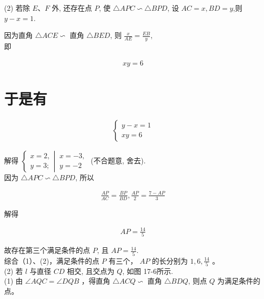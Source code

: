 \documentclass[10pt]{article}
\begin{document}
(2) 若除 $E 、 F$ 外, 还存在点 $P$, 使 $\triangle A P C \backsim \triangle B P D$, 设 $A C=x, B D=y$,则 $y-x=1$.

因为直角 $\triangle A C E \backsim$ 直角 $\triangle B E D$, 则 $\frac{x}{A E}=\frac{E B}{y}$,\\
即

\begin{align*}
x y=6
\end{align*}

\section*{于是有}
\begin{align*}
\left\{\begin{array}{l}
y-x=1 \\
x y=6
\end{array}\right.
\end{align*}

解得 $\left\{\begin{array}{l}x=2, \\ y=3 ;\end{array} \left\lvert\, \begin{array}{l}x=-3, \\ y=-2\end{array}\right.\right.$ (不合题意, 舍去).\\
因为 $\triangle A P C \backsim \triangle B P D$, 所以

\begin{align*}
\frac{A P}{A C}=\frac{B P}{B D}, \frac{A P}{2}=\frac{7-A P}{3}
\end{align*}

解得

\begin{align*}
A P=\frac{14}{5}
\end{align*}

故存在第三个满足条件的点 $P$, 且 $A P=\frac{14}{5}$.\\
综合（1）、(2)，满足条件的点 $P$ 有三个， $A P$ 的长分别为 $1,6, \frac{14}{5}$ 。\\
(2) 若 $l$ 与直径 $C D$ 相交, 且交点为 $Q$, 如图 17-6所示.\\
(1) 由 $\angle A Q C=\angle D Q B$ ，得直角 $\triangle A C Q \backsim$ 直角 $\triangle B D Q$, 则点 $Q$ 为满足条件的点。
\end{document}
